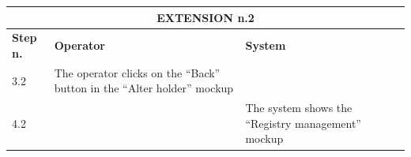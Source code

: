 {{{\begin{center}
			\begin{tabular}{|p{2cm}|p{6cm}|p{6cm}|}
			\hline
				\multicolumn{3}{|c|}{EXTENSION n.2} \\
			\hline
				\centering \vspace{1mm} \bfseries{Step n.} \vspace{1mm} & \vspace{1mm} \bfseries{Operator} \vspace{1mm} & \vspace{1mm} \bfseries{System} \vspace{1mm}\\
			\hline
				\vspace{1mm} 3.2 \vspace{1mm} &
				\vspace{1mm} The operator clicks on the “Back” button in the “Alter holder”  mockup \vspace{1mm} & 
				\vspace{1mm} \vspace{1mm} \\
			\hline
				\vspace{1mm} 4.2 \vspace{1mm} &
				\vspace{1mm} \vspace{1mm} & 
				\vspace{1mm} The system shows the “Registry management” mockup \vspace{1mm} \\
			\hline
			\end{tabular}
			\end{center}
			
			\clearpage

}}}
